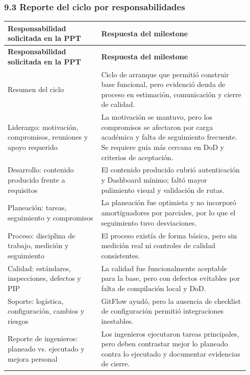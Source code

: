 \documentclass[11pt,a4paper]{article}
\begin{document}
\subsubsection{9.3 Reporte del ciclo por responsabilidades}

\begingroup
\small
\setlength{\tabcolsep}{3pt}
\begin{longtable}{P{0.36\linewidth}P{0.58\linewidth}}
\toprule
\textbf{Responsabilidad solicitada en la PPT} & \textbf{Respuesta del milestone} \\
\midrule
\endfirsthead
\toprule
\textbf{Responsabilidad solicitada en la PPT} & \textbf{Respuesta del milestone} \\
\midrule
\endhead
\bottomrule
\endlastfoot
Resumen del ciclo & Ciclo de arranque que permitió construir base funcional, pero evidenció deuda de proceso en estimación, comunicación y cierre de calidad. \\
Liderazgo: motivación, compromisos, reuniones y apoyo requerido & La motivación se mantuvo, pero los compromisos se afectaron por carga académica y falta de seguimiento frecuente. Se requiere guía más cercana en DoD y criterios de aceptación. \\
Desarrollo: contenido producido frente a requisitos & El contenido producido cubrió autenticación y Dashboard mínimo; faltó mayor pulimiento visual y validación de rutas. \\
Planeación: tareas, seguimiento y compromisos & La planeación fue optimista y no incorporó amortiguadores por parciales, por lo que el seguimiento tuvo desviaciones. \\
Proceso: disciplina de trabajo, medición y seguimiento & El proceso existía de forma básica, pero sin medición real ni controles de calidad consistentes. \\
Calidad: estándares, inspecciones, defectos y PIP & La calidad fue funcionalmente aceptable para la base, pero con defectos evitables por falta de compilación local y DoD. \\
Soporte: logística, configuración, cambios y riesgos & GitFlow ayudó, pero la ausencia de checklist de configuración permitió integraciones inestables. \\
Reporte de ingenieros: planeado vs. ejecutado y mejora personal & Los ingenieros ejecutaron tareas principales, pero deben contrastar mejor lo planeado contra lo ejecutado y documentar evidencias de cierre. \\
\end{longtable}
\endgroup
\end{document}

